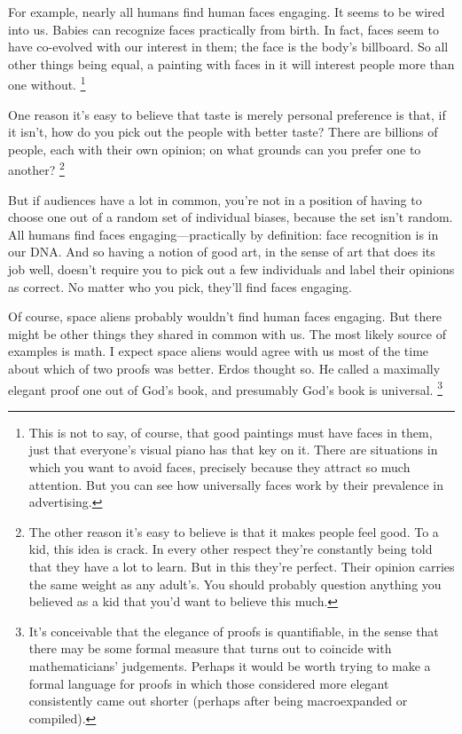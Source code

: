 \documentclass[12pt]{book}
\begin{document}
For example, nearly all humans find human faces engaging. It seems to be
wired into us. Babies can recognize faces practically from birth. In
fact, faces seem to have co-evolved with our interest in them; the face
is the body's billboard. So all other things being equal, a painting
with faces in it will interest people more than one without.
\footnote{This is not to say, of course, that good paintings must have
faces in them, just that everyone's visual piano has that key on it.
There are situations in which you want to avoid faces, precisely because
they attract so much attention. But you can see how universally faces
work by their prevalence in advertising.}

One reason it's easy to believe that taste is merely personal preference
is that, if it isn't, how do you pick out the people with better taste?
There are billions of people, each with their own opinion; on what
grounds can you prefer one to another? \footnote{The other reason it's easy to believe is that it makes people
feel good. To a kid, this idea is crack. In every other respect they're
constantly being told that they have a lot to learn. But in this they're
perfect. Their opinion carries the same weight as any adult's. You
should probably question anything you believed as a kid that you'd want
to believe this much.}

But if audiences have a lot in common, you're not in a position of
having to choose one out of a random set of individual biases, because
the set isn't random. All humans find faces engaging---practically by
definition: face recognition is in our DNA. And so having a notion of
good art, in the sense of art that does its job well, doesn't require
you to pick out a few individuals and label their opinions as correct.
No matter who you pick, they'll find faces engaging.

Of course, space aliens probably wouldn't find human faces engaging. But
there might be other things they shared in common with us. The most
likely source of examples is math. I expect space aliens would agree
with us most of the time about which of two proofs was better. Erdos
thought so. He called a maximally elegant proof one out of God's book,
and presumably God's book is universal. \footnote{It's conceivable that the elegance of proofs is quantifiable, in
the sense that there may be some formal measure that turns out to
coincide with mathematicians' judgements. Perhaps it would be worth
trying to make a formal language for proofs in which those considered
more elegant consistently came out shorter (perhaps after being
macroexpanded or compiled).}
\end{document}
